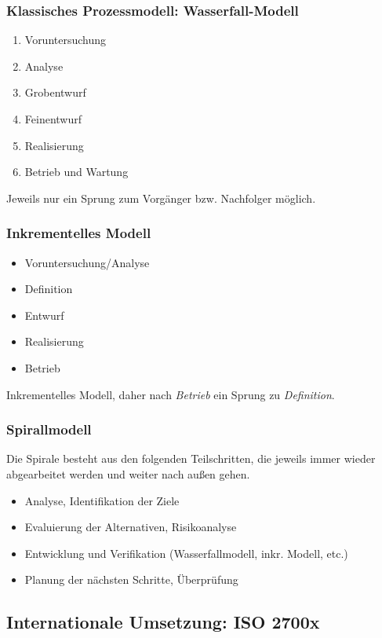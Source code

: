 \subsubsection{Klassisches Prozessmodell: Wasserfall-Modell}
\begin{enumerate}
	\item Voruntersuchung
	\item Analyse
	\item Grobentwurf
	\item Feinentwurf
	\item Realisierung
	\item Betrieb und Wartung
\end{enumerate}
Jeweils nur ein Sprung zum Vorgänger bzw. Nachfolger möglich.

\subsubsection{Inkrementelles Modell}
\begin{itemize}
	\item Voruntersuchung/Analyse
	\item Definition
	\item Entwurf
	\item Realisierung
	\item Betrieb
\end{itemize}
Inkrementelles Modell, daher nach \textit{Betrieb} ein Sprung zu \textit{Definition}.

\subsubsection{Spirallmodell}
Die Spirale besteht aus den folgenden Teilschritten, die jeweils immer wieder abgearbeitet werden und weiter nach außen gehen.
\begin{itemize}
	\item Analyse, Identifikation der Ziele
	\item Evaluierung der Alternativen, Risikoanalyse
	\item Entwicklung und Verifikation (Wasserfallmodell, inkr. Modell, etc.)
	\item Planung der nächsten Schritte, Überprüfung
\end{itemize}

\subsection{Internationale Umsetzung: ISO 2700x}

